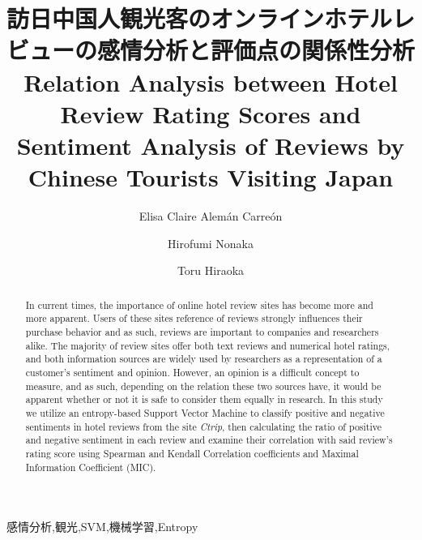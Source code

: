 \documentclass[review]{elsarticle}
\begin{document}
\begin{CJK}{UTF8}{min}

\begin{frontmatter}

\title{訪日中国人観光客のオンラインホテルレビューの感情分析と評価点の関係性分析 \\ Relation Analysis between Hotel Review Rating Scores and Sentiment Analysis of Reviews by Chinese Tourists Visiting Japan}

\author[gidai]{Elisa Claire Alem\'an Carre\'on
}

\author[gidai]{Hirofumi Nonaka}

\author[nagasaki]{Toru Hiraoka}

\address[gidai]{Nagaoka University of Technology, Nagaoka, Japan}
\address[nagasaki]{University of Nagasaki, Nagasaki, Japan}


\begin{abstract}

In current times, the importance of online hotel review sites has become more and more apparent. Users of these sites reference of reviews strongly influences their purchase behavior and as such, reviews are important to companies and researchers alike. The majority of review sites offer both text reviews and numerical hotel ratings, and both information sources are widely used by researchers as a representation of a customer's sentiment and opinion. However, an opinion is a difficult concept to measure, and as such, depending on the relation these two sources have, it would be apparent whether or not it is safe to consider them equally in research. In this study we utilize an entropy-based Support Vector Machine to classify positive and negative sentiments in hotel reviews from the site \textit{Ctrip}, then calculating the ratio of positive and negative sentiment in each review and examine their correlation with said review's rating score using Spearman and Kendall Correlation coefficients and Maximal Information Coefficient (MIC).


\end{abstract}

\begin{keyword}

感情分析\sep 観光\sep SVM\sep 機械学習\sep Entropy


\end{keyword}
\end{frontmatter}
\end{CJK}
\end{document}
